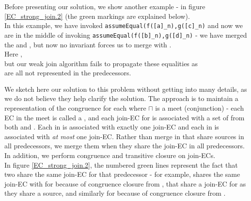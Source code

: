 \bigskip
\noindent
Before presenting our solution, we show another example - in figure \ref{EC_strong_join.2} (the green markings are explained below).\\
In this example, we have invoked \lstinline|assumeEqual(f([a]_n),g([c]_n)| and now we are in the middle of invoking 
\lstinline|assumeEqual(f([b]_n),g([d]_n)| - we have merged the \GTs{}  and , but now no invariant forces us to merge  with .\\
Here ,\\
 but our weak join algorithm fails to propagate these equalities as \\
 are all not represented in the predecessors.

\bigskip
\noindent
We sketch here our solution to this problem without getting into many details, as we do not believe they help clarify the solution.
The approach is to maintain a representation of the congruence  for each  where $\sqcap$ is a meet (conjunction) - each EC in the meet is called a , and each join-EC for  is associated with a set of \GTs{} from both  and . Each \GT{} in  is associated with exactly one join-EC and each \GT{} in  is associated with \emph{at most} one join-EC. Rather than merge \GTs{} in  that share sources in all predecessors, we merge them when they share the join-EC in all predecessors. In addition, we perform congruence and transitive closure on join-ECs.\\
In figure \ref{EC_strong_join.2}, the numbered green lines represent the fact that two \GTs{} share the same join-EC for that predecessor - for example,  shares the same join-EC with  for  because of congruence closure from , that share a join-EC for  as they share a source, and similarly for  because of congruence closure from  .

